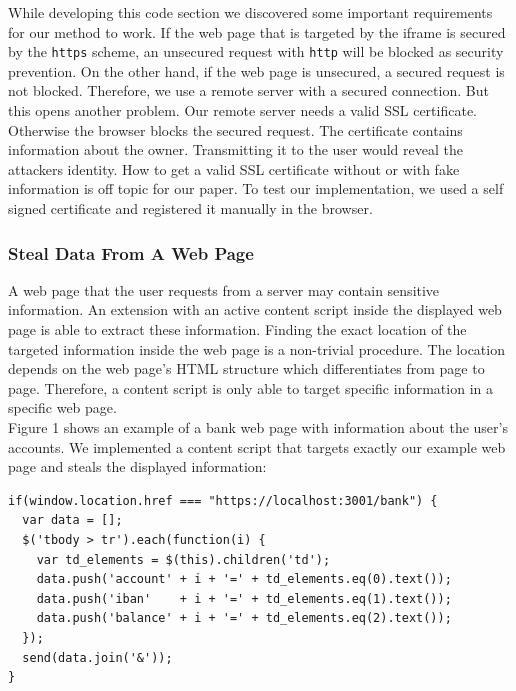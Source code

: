\documentclass[article,colorback,accentcolor=tud9c,type=bsc]{tudthesis}
\let\stdsubsubsection\subsubsection
\renewcommand\subsubsection{\newpage\stdsubsubsection}
\begin{document}
	While developing this code section we discovered some important requirements for our method to work. If the web page that is targeted by the iframe is secured by the \texttt{https} scheme, an unsecured request with \texttt{http} will be blocked as security prevention. On the other hand, if the web page is unsecured, a secured request is not blocked. Therefore, we use a remote server with a secured connection. But this opens another problem. Our remote server needs a valid SSL certificate. Otherwise the browser blocks the secured request. The certificate contains information about the owner. Transmitting it to the user would reveal the attackers identity. How to get a valid SSL certificate without or with fake information is off topic for our paper. To test our implementation, we used a self signed certificate and registered it manually in the browser. \\
	
	\subsubsection{Steal Data From A Web Page}
	
	A web page that the user requests from a server may contain sensitive information. An extension with an active content script inside the displayed web page is able to extract these information. Finding the exact location of the targeted information inside the web page is a non-trivial procedure. The location depends on the web page's HTML structure which differentiates from page to page. Therefore, a content script is only able to target specific information in a specific web page. \\
	
	Figure 1 shows an example of a bank web page with information about the user's accounts. We implemented a content script that targets exactly our example web page and steals the displayed information: 
	
	\begin{lstlisting}
if(window.location.href === "https://localhost:3001/bank") {
  var data = [];
  $('tbody > tr').each(function(i) {
    var td_elements = $(this).children('td');
    data.push('account' + i + '=' + td_elements.eq(0).text());
    data.push('iban'    + i + '=' + td_elements.eq(1).text());
    data.push('balance' + i + '=' + td_elements.eq(2).text());
  });
  send(data.join('&'));
}
	\end{lstlisting}
	
\end{document}

